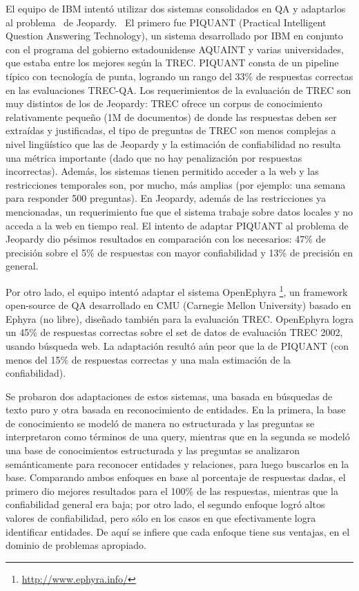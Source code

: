 El equipo de IBM intentó utilizar dos sistemas consolidados en QA y
adaptarlos al problema \ de Jeopardy. \ El primero fue PIQUANT
(Practical Intelligent Question Answering Technology), un sistema
desarrollado por IBM en conjunto con el programa del gobierno
estadounidense AQUAINT y varias universidades, que estaba entre los
mejores según la TREC. PIQUANT consta de un pipeline típico con
tecnología de punta, logrando un rango del 33\% de respuestas
correctas en las evaluaciones TREC-QA. Los requerimientos de la
evaluación de TREC son muy distintos de los de Jeopardy: TREC ofrece
un corpus de conocimiento relativamente pequeño (1M de documentos) de
donde las respuestas deben ser extraídas y justificadas, el tipo de
preguntas de TREC son menos complejas a nivel lingüístico que las
de Jeopardy y la estimación de confiabilidad no resulta una métrica
importante (dado que no hay penalización por respuestas incorrectas).
Además, los sistemas tienen permitido acceder a la web y las
restricciones temporales son, por mucho, más amplias (por ejemplo:
una semana para responder 500 preguntas). En Jeopardy, además de las
restricciones ya mencionadas, un requerimiento fue que el sistema
trabaje sobre datos locales y no acceda a la web en tiempo real. El
intento de adaptar PIQUANT al problema de Jeopardy dio pésimos resultados en
comparación con los necesarios: 47\% de precisión sobre el 5\% de
respuestas con mayor confiabilidad y 13\% de precisión en general.

Por otro lado, el equipo intentó adaptar el sistema OpenEphyra \footnote{\url{http://www.ephyra.info/}}, un framework open-source de QA desarrollado en
CMU (Carnegie Mellon University) basado en Ephyra (no libre), diseñado también para la evaluación TREC. OpenEphyra logra un 45\% de respuestas correctas sobre el set de datos de evaluación TREC
2002, usando búsqueda web. La adaptación resultó aún peor que la de PIQUANT (con menos del 15\% de respuestas correctas y una mala estimación de la confiabilidad).

Se probaron dos adaptaciones de estos sistemas, una basada en búsquedas de texto puro y otra basada en reconocimiento de entidades. En la primera, la base de conocimiento se modeló de manera no
estructurada y las preguntas se interpretaron como términos de una query, mientras que en la segunda se modeló una base de conocimientos estructurada y las preguntas se analizaron semánticamente para
reconocer entidades y relaciones, para luego buscarlos en la base. Comparando ambos enfoques en base al porcentaje de respuestas dadas, el primero dio mejores resultados para el 100\% de las respuestas,
mientras que la confiabilidad general era baja; por otro lado, el segundo enfoque logró altos valores de confiabilidad, pero sólo en los casos en que efectivamente logra identificar entidades. De aquí
se infiere que cada enfoque tiene sus ventajas, en el dominio de problemas apropiado.

